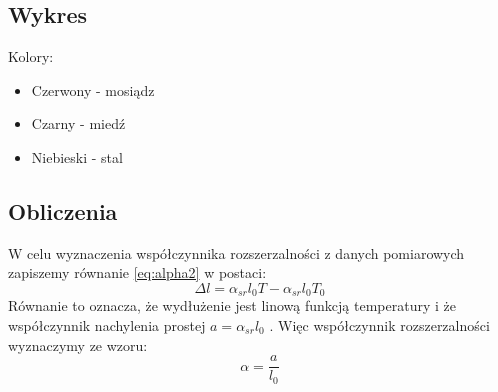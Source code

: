 \documentclass[a4paper, 11pt]{article}
\begin{document}
\subsection{Wykres}\label{sub:wykres} %
\begin{center}
\end{center}
Kolory:
\begin{itemize}
	\item Czerwony - mosiądz
	\item Czarny - miedź
	\item Niebieski - stal
\end{itemize}

\subsection{Obliczenia}\label{sub:obliczenia} %
W celu wyznaczenia współczynnika rozszerzalności z danych pomiarowych zapiszemy równanie \eqref{eq:alpha2} w postaci:
\begin{equation}
	\Delta l = \alpha_{sr} l_0 T - \alpha_{sr} l_0 T_0
\end{equation}
Równanie to oznacza, że wydłużenie jest linową funkcją temperatury i że współczynnik nachylenia prostej
$a = \alpha_{sr}l_0$ . Więc współczynnik rozszerzalności wyznaczymy ze wzoru:
\begin{equation}
	\alpha = \frac{a}{l_0}
\end{equation}
\end{document}
